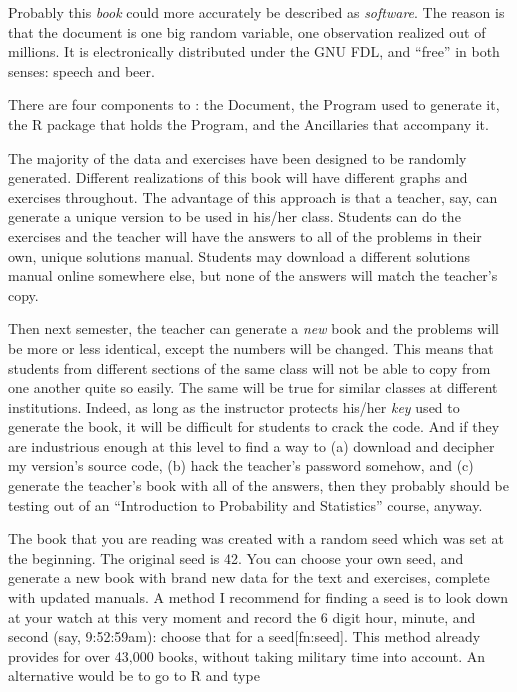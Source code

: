 \documentclass[captions=tableheading]{scrbook}
\begin{document}
\label{cha:Instructions-for-Instructors}



Probably this \emph{book} could more accurately be described as \emph{software}. The reason is that the document is one big random variable, one observation realized out of millions. It is electronically distributed under the GNU FDL, and ``free'' in both senses: speech and beer.  

There are four components to \IPSUR: the Document, the Program used to generate it, the \textsf{R} package that holds the Program, and the Ancillaries that accompany it.

The majority of the data and exercises have been designed to be randomly generated. Different realizations of this book will have different graphs and exercises throughout. The advantage of this approach is that a teacher, say, can generate a unique version to be used in his/her class. Students can do the exercises and the teacher will have the answers to all of the problems in their own, unique solutions manual. Students may download a different solutions manual online somewhere else, but none of the answers will match the teacher's copy. 

Then next semester, the teacher can generate a \emph{new} book and the problems will be more or less identical, except the numbers will be changed. This means that students from different sections of the same class will not be able to copy from one another quite so easily. The same will be true for similar classes at different institutions. Indeed, as long as the instructor protects his/her \emph{key} used to generate the book, it will be difficult for students to crack the code. And if they are industrious enough at this level to find a way to (a) download and decipher my version's source code, (b) hack the teacher's password somehow, and (c) generate the teacher's book with all of the answers, then they probably should be testing out of an ``Introduction to Probability and Statistics'' course, anyway. 

The book that you are reading was created with a random seed which was set at the beginning. The original seed is 42. You can choose your own seed, and generate a new book with brand new data for the text and exercises, complete with updated manuals. A method I recommend for finding a seed is to look down at your watch at this very moment and record the 6 digit hour, minute, and second (say, 9:52:59am): choose that for a seed[fn:seed]. This method already provides for over 43,000 books, without taking military time into account. An alternative would be to go to \textsf{R} and type 
\end{document}
